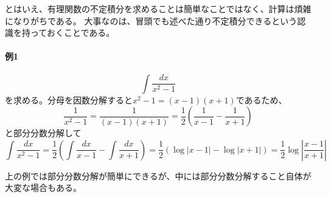 \documentclass[a4j,dvipdfmx]{jsarticle}
\begin{document}
                とはいえ、有理関数の不定積分を求めることは簡単なことではなく、計算は煩雑になりがちである。
                大事なのは、冒頭でも述べた通り不定積分できるという認識を持っておくことである。

                \paragraph{例1}
                \begin{equation*}
                    \int \frac{dx}{x^2-1}
                \end{equation*}
                を求める。分母を因数分解すると$x^2-1=(x-1)(x+1)$であるため、
                \begin{equation*}
                    \frac{1}{x^2-1}=\frac{1}{(x-1)(x+1)}=\frac{1}{2}\left(\frac{1}{x-1}-\frac{1}{x+1}\right)
                \end{equation*}
                と部分分数分解して
                \begin{equation*}
                    \int \frac{dx}{x^2-1}=\frac{1}{2}\left(\int \frac{dx}{x-1}-\int \frac{dx}{x+1}\right)=\frac{1}{2}\left(\log|x-1|-\log|x+1|\right)=\frac{1}{2}\log\left|\frac{x-1}{x+1}\right|
                \end{equation*}

                上の例では部分分数分解が簡単にできるが、中には部分分数分解すること自体が大変な場合もある。
\end{document}
